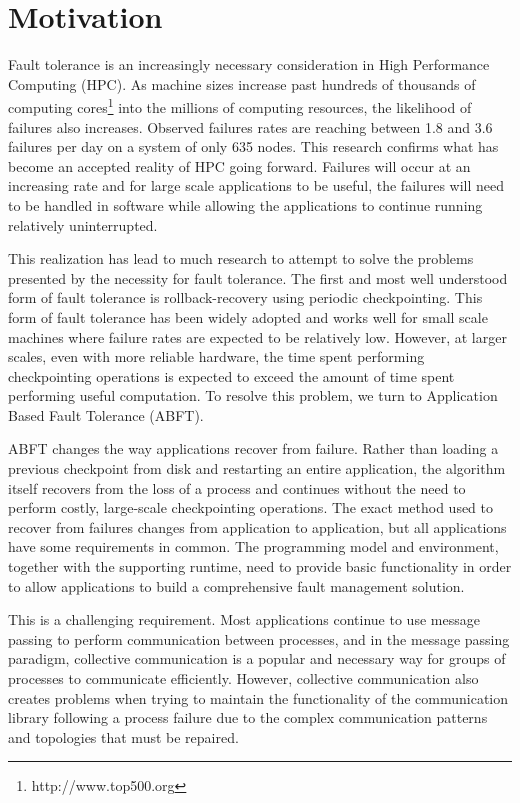 \section{Motivation} \label{sect:intro}

Fault tolerance is an increasingly necessary consideration in High Performance Computing (HPC). As machine sizes increase past hundreds of thousands of computing cores\footnote{http://www.top500.org} into the millions of computing resources, the likelihood of failures also increases. Observed failures rates are reaching between 1.8 and 3.6 failures per day on a system of only 635 nodes. This research confirms what has become an accepted reality of HPC going forward. Failures will occur at an increasing rate and for large scale applications to be useful, the failures will need to be handled in software while allowing the applications to continue running relatively uninterrupted.

This realization has lead to much research to attempt to solve the problems presented by the necessity for fault tolerance. The first and most well understood form of fault tolerance is rollback-recovery using periodic checkpointing. This form of fault tolerance has been widely adopted and works well for small scale machines where failure rates are expected to be relatively low. However, at larger scales, even with more reliable hardware, the  time spent performing checkpointing operations is expected to exceed the amount of time spent performing useful computation. To resolve this problem, we turn to Application Based Fault Tolerance (ABFT).

ABFT changes the way applications recover from failure. Rather than loading a previous checkpoint from disk and restarting an entire application, the algorithm itself recovers from the loss of a process and continues without the need to perform costly, large-scale checkpointing operations. The exact method used to recover from failures changes from application to application, but all applications have some requirements in common. The programming model and environment, together with the supporting runtime, need to provide basic functionality in order to allow applications to build a comprehensive fault management solution.

This is a challenging requirement. Most applications continue to use message passing to perform communication between processes, and in the message passing paradigm, collective communication is a popular and necessary way for groups of processes to communicate efficiently. However, collective communication also creates problems when trying to maintain the functionality of the communication library following a process failure due to the complex communication patterns and topologies that must be repaired. 

